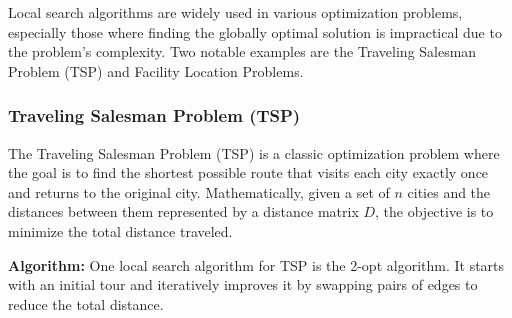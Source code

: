 \documentclass[12pt]{book} %
\begin{document}
Local search algorithms are widely used in various optimization problems, especially those where finding the globally optimal solution is impractical due to the problem's complexity. Two notable examples are the Traveling Salesman Problem (TSP) and Facility Location Problems.

\subsubsection{Traveling Salesman Problem (TSP)}

The Traveling Salesman Problem (TSP) is a classic optimization problem where the goal is to find the shortest possible route that visits each city exactly once and returns to the original city. Mathematically, given a set of \(n\) cities and the distances between them represented by a distance matrix \(D\), the objective is to minimize the total distance traveled.

\textbf{Algorithm:} One local search algorithm for TSP is the 2-opt algorithm. It starts with an initial tour and iteratively improves it by swapping pairs of edges to reduce the total distance.
\end{document}
